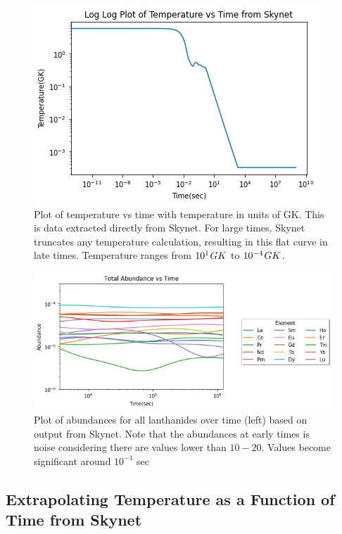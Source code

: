 \documentclass[11pt,a4paper]{article}
\begin{document}
\begin{figure}[h!]
  \includegraphics[scale = .75]{skynet_non_linear.png}
  \centering
  \caption{Plot of temperature vs time with temperature in units of GK. This is data extracted directly from Skynet. For large times, Skynet truncates any temperature calculation, resulting in this flat curve in late times. Temperature ranges from $10^1 \hspace{.03 cm} GK$ to $10^{-4} \hspace{.03 cm} GK$.}
\end{figure}

\begin{figure}[h!]
  \includegraphics[scale = .65]{elemental.png}
  \centering
  \caption{Plot of abundances for all lanthanides over time (left) based on output from Skynet. Note that the abundances at early times is noise considering there are values lower than $10-20$. Values become significant around $10^{-1}$ sec}
\end{figure} 


\subsection{Extrapolating Temperature as a Function of Time from Skynet}
\end{document}
